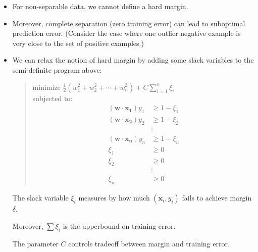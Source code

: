 \documentclass[10pt]{article}
\begin{document}
\begin{itemize}
    \item For non-separable data, we cannot define a hard margin.
    
    \item Moreover, complete separation (zero training error)
        can lead to suboptimal prediction error. (Consider the 
        case where one outlier negative example is very close
        to the set of positive examples.)
        
    \item We can relax the notion of hard margin by adding 
        some slack variables to the semi-definite program
        above:
        \begin{quote}
            minimize $\frac{1}{2} (w_1^2 + w_2^2 + \dotsb + w_n^2)+ C\sum_{i=1}^n \xi_i$ \\            
            subjected to:
            \begin{align*}
                (\mathbf{w}\cdot\mathbf{x_1})y_1 &\geq 1 - \xi_1\\
                (\mathbf{w}\cdot\mathbf{x_2})y_2 &\geq 1 - \xi_2\\
                &\vdots\\
                (\mathbf{w}\cdot\mathbf{x_n})y_n &\geq 1 - \xi_n\\
                \xi_1 &\geq 0\\
                \xi_2 &\geq 0\\
                &\vdots\\
                \xi_n &\geq 0
            \end{align*}
        \end{quote}
        The slack variable $\xi_i$ measures by how much
        $(\mathbf{x}_i,y_i)$ fails to achieve margin $\delta$.
        
        Moreover, $\sum \xi_i$ is the upperbound on training error.
        
        The parameter $C$ controls tradeoff between margin
        and training error.
\end{itemize}
\end{document}
